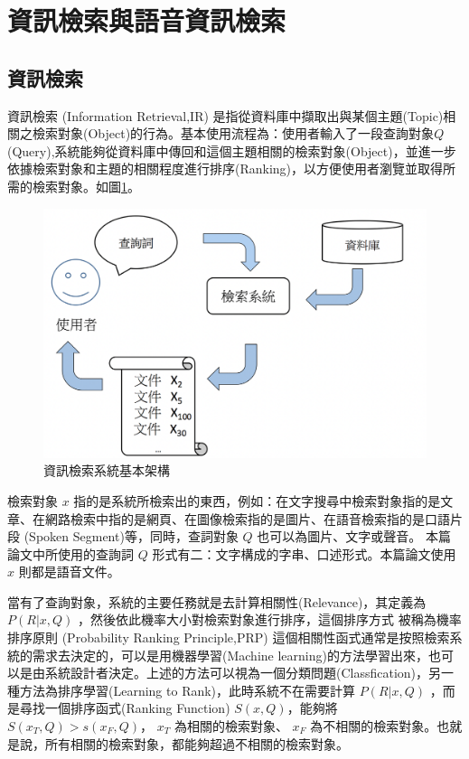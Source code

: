 \section{資訊檢索與語音資訊檢索}

\subsection{資訊檢索}


資訊檢索 (Information Retrieval,IR)
是指從資料庫中擷取出與某個主題(Topic)相關之檢索對象(Object)的行為。基本使用流程為：使用者輸入了一段查詢對象$Q$(Query),系統能夠從資料庫中傳回和這個主題相關的檢索對象(Object)，並進一步依據檢索對象和主題的相關程度進行排序(Ranking)，以方便使用者瀏覽並取得所需的檢索對象。如圖\ref{fig:ch2_IR}。
\begin{figure}
\centering
\includegraphics[scale=0.5]{images/ch2_Ir.png}
\caption{資訊檢索系統基本架構} \label{fig:ch2_IR}
\end{figure}

檢索對象 $x$ 指的是系統所檢索出的東西，例如：在文字搜尋中檢索對象指的是文章、在網路檢索中指的是網頁、在圖像檢索指的是圖片、在語音檢索指的是口語片段 (Spoken Segment)等，同時，查詞對象 $Q$ 也可以為圖片、文字或聲音。
本篇論文中所使用的查詢詞 $Q$ 形式有二：文字構成的字串、口述形式。本篇論文使用 $x$ 則都是語音文件。

當有了查詢對象，系統的主要任務就是去計算相關性(Relevance)，其定義為 $P(R|x,Q)$ ，然後依此機率大小對檢索對象進行排序，這個排序方式
被稱為機率排序原則 (Probability Ranking Principle,PRP)\cite{robertson1997probability}
這個相關性函式通常是按照檢索系統的需求去決定的，可以是用機器學習(Machine
learning)的方法學習出來，也可以是由系統設計者決定。上述的方法可以視為一個分類問題(Classfication)，另一種方法為排序學習(Learning
to Rank)，此時系統不在需要計算 $P(R|x,Q)$ ，而是尋找一個排序函式(Ranking Function)
$S(x,Q)$，能夠將$ S(x_T,Q)>s(x_F,Q)$， $x_T$ 為相關的檢索對象、 $x_F$
為不相關的檢索對象。也就是說，所有相關的檢索對象，都能夠超過不相關的檢索對象。

